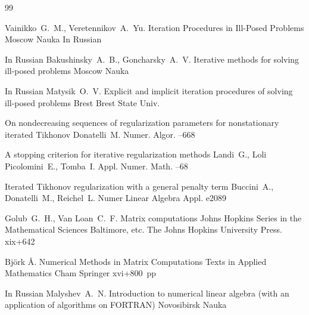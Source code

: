 



\begin{thebibliography}{99}

\by Vainikko~G.~M., Veretennikov~A.~Yu.
\book Iteration Procedures in Ill-Posed Problems
\publaddr Moscow
\publ Nauka
\lang In Russian

\lang In Russian
\by  Bakushinsky~A.~B., Goncharsky~A.~V.
\book Iterative methods for solving ill-posed problems
\publaddr Moscow
\publ Nauka

\lang In Russian
\by  Matysik~O.~V.
\book  Explicit and implicit iteration procedures of solving ill-posed problems
\publaddr Brest
\publ Brest State Univ.

\paper On nondecreasing sequences of regularization parameters for nonstationary iterated Tikhonov
\by  Donatelli~M.
\jour Numer. Algor.
--668

\paper  A stopping criterion for iterative regularization methods
\by Landi~G., Loli Picolomini~E., Tomba~I.
\jour Appl. Numer. Math.
--68


\paper Iterated Tikhonov regularization with a general penalty term
\by Buccini~A., Donatelli~M., Reichel~L.
\jour Numer Linear Algebra Appl.
\papernumber e2089

\by Golub~G.~H., Van Loan~C.~F.
\book Matrix computations
\serial Johns Hopkins Series in the Mathematical Sciences
\publaddr Baltimore, etc.
\publ The Johns Hopkins University Press.
\totalpages  xix+642

\by  Bj\"ork \AA. 
\book  Numerical Methods in Matrix Computations
\serial Texts in Applied Mathematics
\publaddr  Cham
\publ Springer
\totalpages xvi+800~pp \nofrills 
{}

\lang In Russian
\by Malyshev~A.~N.
\book Introduction to numerical linear algebra (with an application of algorithms on FORTRAN)
\publaddr Novosibirsk
\publ Nauka


\end{thebibliography}
